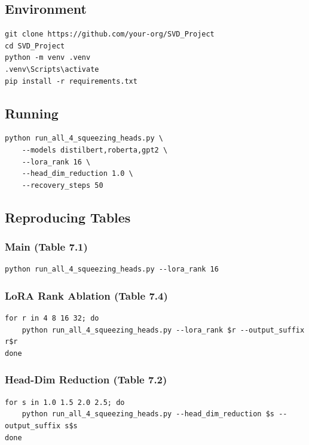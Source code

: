 \subsection{Environment}

\begin{lstlisting}
git clone https://github.com/your-org/SVD_Project
cd SVD_Project
python -m venv .venv
.venv\Scripts\activate
pip install -r requirements.txt
\end{lstlisting}

\subsection{Running}

\begin{lstlisting}
python run_all_4_squeezing_heads.py \
    --models distilbert,roberta,gpt2 \
    --lora_rank 16 \
    --head_dim_reduction 1.0 \
    --recovery_steps 50
\end{lstlisting}

\subsection{Reproducing Tables}

\subsubsection{Main (Table 7.1)}
\begin{lstlisting}
python run_all_4_squeezing_heads.py --lora_rank 16
\end{lstlisting}

\subsubsection{LoRA Rank Ablation (Table 7.4)}
\begin{lstlisting}
for r in 4 8 16 32; do
    python run_all_4_squeezing_heads.py --lora_rank $r --output_suffix r$r
done
\end{lstlisting}

\subsubsection{Head-Dim Reduction (Table 7.2)}
\begin{lstlisting}
for s in 1.0 1.5 2.0 2.5; do
    python run_all_4_squeezing_heads.py --head_dim_reduction $s --output_suffix s$s
done
\end{lstlisting}

